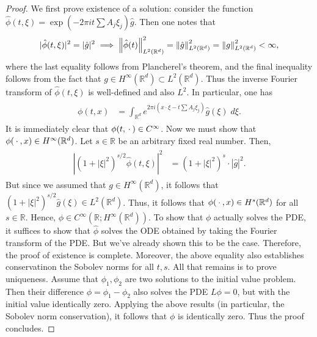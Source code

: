 \documentclass{article}
\begin{document}
\begin{proof}
	We first prove existence of a solution: consider the function $\hat{\phi}(t, \xi) = \exp\left(-2\pi it\sum A_{j}\xi_{j}\right)\hat{g}$. Then one notes that 
	\begin{equation*}
		|\hat{\phi}(t, \xi)|^{2} = |\hat{g}|^{2} \implies \left\Vert \hat{\phi}(t) \right\Vert_{L^{2}(\mathbb{R}^{d})}^{2} = \left\Vert \hat{g} \right\Vert_{L^{2}(\mathbb{R}^{d})}^{2} = \left\Vert g \right\Vert_{L^{2}(\mathbb{R}^{d})}^{2} < \infty, 
	\end{equation*}
	where the last equality follows from Plancherel's theorem, and the final inequality follows from the fact that $g \in H^{\infty}(\mathbb{R}^{d}) \subset L^{2}(\mathbb{R}^{d})$. Thus the inverse Fourier transform of $\hat{\phi}(t, \xi)$ is well-defined and also $L^{2}$. In particular, one has 
	\begin{align*}
		\begin{split}
			\phi(t, x) &= \int_{\mathbb{R}^{d}}e^{2\pi i (x \cdot \xi - t\sum A_{j}\xi_{j})}\hat{g}(\xi)\;d\xi. 
		\end{split} 
	\end{align*}
	It is immediately clear that $\phi(t, \hspace{2pt}\cdot\hspace{2pt}) \in C^{\infty}$. Now we must show that $\phi(\hspace{2pt}\cdot\hspace{2pt}, x) \in H^{\infty}(\mathbb{R}^{d})$. Let $s \in \mathbb{R}$ be an arbitrary fixed real number. Then, 
	\begin{align*}
		\begin{split}
			|(1 + |\xi|^{2})^{s/2}\hat{\phi}(t, \xi)|^{2} &= (1 + |\xi|^{2})^{s} \cdot |\hat{g}|^{2}. 
		\end{split} 
	\end{align*}
	But since we assumed that $g \in H^{\infty}(\mathbb{R}^{d})$, it follows that $(1 + |\xi|^{2})^{s/2}\hat{g}(\xi) \in L^{2}(\mathbb{R}^{d})$. Thus, it follows that $\phi(\hspace{2pt}\cdot\hspace{2pt}, x) \in H^{s}(\mathbb{R}^{d})$ for all $s \in \mathbb{R}$. Hence, $\phi \in C^{\infty}(\mathbb{R}; H^{\infty}(\mathbb{R}^{d}))$. To show that $\phi$ actually solves the PDE, it suffices to show that $\hat{\phi}$ solves the ODE obtained by taking the Fourier transform of the PDE. But we've already shown this to be the case. Therefore, the proof of existence is complete. Moreover, the above equality also establishes conservatinon the Sobolev norms for all $t, s$. All that remains is to prove uniqueness. Assume that $\phi_{1}, \phi_{2}$ are two solutions to the initial value problem. Then their difference $\phi = \phi_{1} - \phi_{2}$ also solves the PDE $L\phi = 0$, but with the initial value identically zero. Applying the above results (in particular, the Sobolev norm conservation), it follows that $\phi$ is identically zero. Thus the proof concludes. 
\end{proof} 
\end{document}
